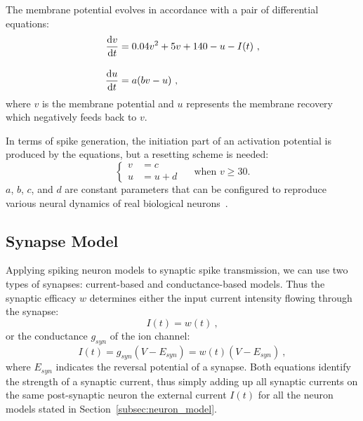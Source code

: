 The membrane potential evolves in accordance with a pair of differential equations:
\begin{equation}
\begin{aligned}
\dfrac{\mathrm{d} v}{\mathrm{d} t} &= 0.04v^2 + 5v + 140 - u - I(t)~,\\[10pt]
\dfrac{\mathrm{d} u}{\mathrm{d} t} &= a(bv - u)~,
\end{aligned}
\end{equation}
where $v$ is the membrane potential and $u$ represents the membrane recovery which negatively feeds back to $v$.
\DIFaddbegin 

\DIFaddend In terms of spike generation, the initiation part of an activation potential is produced by the equations, but a resetting scheme is needed:
\begin{equation}
\left\{
\begin{aligned}
v &= c \\
u &= u + d
\end{aligned}
\right.
\textrm{~~~~when~} v \geq 30.
\end{equation}  
$a$, $b$, $c$, and $d$ are constant parameters that can be configured to reproduce various neural dynamics of real biological neurons~\citep{izhikevich2004model}.

\subsection{Synapse Model}
Applying spiking neuron models to synaptic spike transmission, we can use two types of synapses: current-based and conductance-based models.
Thus the synaptic efficacy $w$ determines either the input current intensity flowing through the synapse: %
\begin{equation}
I(t) = w(t)~,
\end{equation}
or the \DIFdelbegin {}\DIFdelend \DIFaddbegin {}\DIFaddend conductance $g_{syn}$ of the ion channel: %
\begin{equation}
I(t) = g_{syn} (V-E_{syn}) = w(t) (V-E_{syn})~,
\end{equation}
where $E_{syn}$ indicates the reversal potential of a synapse.
Both equations identify the strength of a synaptic current, thus simply adding up all synaptic currents on the same post-synaptic neuron \DIFdelbegin {}\DIFdelend \DIFaddbegin {}\DIFaddend the external current $I(t)$ for all the neuron models stated in Section~\ref{subsec:neuron_model}.

